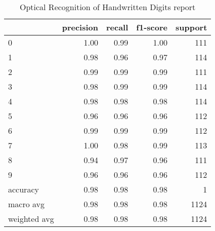 \begin{table}
\caption{Optical Recognition of Handwritten Digits report}
\begin{tabular}{lrrrr}
\toprule
 & precision & recall & f1-score & support \\
\midrule
0 & 1.00 & 0.99 & 1.00 & 111 \\
1 & 0.98 & 0.96 & 0.97 & 114 \\
2 & 0.99 & 0.99 & 0.99 & 111 \\
3 & 0.98 & 0.99 & 0.99 & 114 \\
4 & 0.98 & 0.98 & 0.98 & 114 \\
5 & 0.96 & 0.96 & 0.96 & 112 \\
6 & 0.99 & 0.99 & 0.99 & 112 \\
7 & 1.00 & 0.98 & 0.99 & 113 \\
8 & 0.94 & 0.97 & 0.96 & 111 \\
9 & 0.96 & 0.96 & 0.96 & 112 \\
accuracy & 0.98 & 0.98 & 0.98 & 1 \\
macro avg & 0.98 & 0.98 & 0.98 & 1124 \\
weighted avg & 0.98 & 0.98 & 0.98 & 1124 \\
\bottomrule
\end{tabular}
\end{table}

